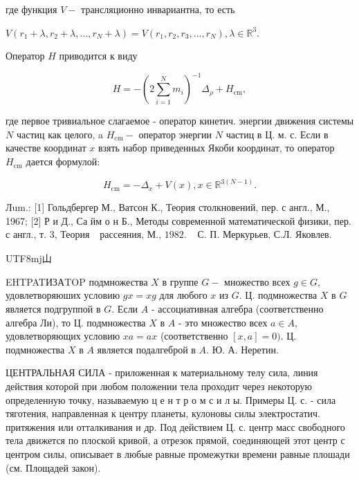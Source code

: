 \documentclass[10pt]{article}
\begin{document}
где функция $V-$ трансляционно инвариантна, то есть



$V\left(r_{1}+\lambda, r_{2}+\lambda, \ldots, r_{N}+\lambda\right)=V\left(r_{1}, r_{2}, r_{3}, \ldots, r_{N}\right), \lambda \in \mathbb{R}^{3}$.



Оператор $H$ приводится к виду



\[

H=-\left(2 \sum_{i=1}^{N} m_{i}\right)^{-1} \Delta_{\rho}+H_{\mathrm{cm}},

\]



где первое тривиальное слагаемое - оператор кинетич. энергии движения системы $N$ частиц как целого, a $H_{\mathrm{cm}}-$ оператор энергии $N$ частиц в Ц. м. с. Если в качестве координат $x$ взять набор приведенных Якоби координат, то оператор $H_{\mathrm{cm}}$ дается формулой:



\[

H_{\mathrm{cm}}=-\Delta_{x}+V(x), x \in \mathbb{R}^{3(N-1)} .

\]



Лum.: [1] Гольдбергер М., Ватсон К., Теория столкновений, пер. с англ., М., 1967; [2] Р и Д., Са йм о н Б., Методы современной математической физики, пер. с англ., т. 3, Теория $\begin{array}{ll}\text { рассеяния, М., } 1982 . & \text { С. П. Меркурьев, С.Л. Яковлев. }\end{array}$ \begin{CJK}{UTF8}{mj}山\end{CJK}EHTPATИЗАTOP подмножества $X$ в группе $G-$ множество всех $g \in G$, удовлетворяюших условию $g x=x g$ для любого $x$ из $G$. Ц. подмножества $X$ в $G$ является подгруппой в $G$. Если $A$ - ассоциативная алгебра (соответственно алгебра Ли), то Ц. подмножества $X$ в $A$ - это множество всех $a \in A$, удовлетворяющих условию $x a=a x$ (соответственно $[x, a]=0)$. Ц. подмножества $X$ в $A$ является подалгеброй в $A$. Ю. А. Неретин.



ЦЕНТРАЛЬНАЯ СИЛА - приложенная к материальному телу сила, линия действия которой при любом положении тела проходит через некоторую определенную точку, называемую ц е н т р о м с и л ы. Примеры Ц. с. - сила тяготения, направленная к центру планеты, кулоновы силы электростатич. притяжения или отталкивания и др. Под действием Ц. с. центр масс свободного тела движется по плоской кривой, а отрезок прямой, соединяющей этот центр с центром силы, описывает в любые равные промежутки времени равные плошади (см. Площадей закон).
\end{document}

